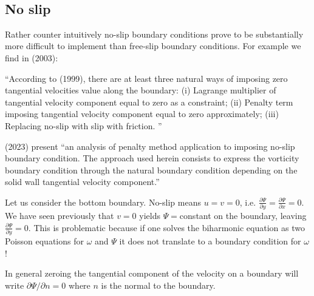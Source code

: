 \begin{center}
\\
\textcite{laym97}
\end{center}

\subsection{No slip}

Rather counter intuitively no-slip boundary conditions prove to be substantially 
more difficult to implement than free-slip boundary conditions.
For example we find in \textcite{dedz03} (2003):
\begin{displayquote}
{\color{darkgray}
``According to \textcite{layt99} (1999), there are at least three natural ways of imposing zero tangential
velocities value along the boundary:
(i) Lagrange multiplier of tangential velocity component equal to zero as a constraint;
(ii) Penalty term imposing tangential velocity component equal to zero approximately;
(iii) Replacing no-slip with slip with friction.
''}
\end{displayquote}
\textcite{dedz03} (2023) present ``an analysis of penalty method application to imposing no-slip boundary
condition. The approach used herein consists to express the vorticity boundary condition through
the natural boundary condition depending on the solid wall tangential velocity component.''

Let us consider the bottom boundary. No-slip means $u=v=0$, i.e.
$\frac{\partial \Psi}{\partial y}=\frac{\partial \Psi}{\partial x}=0$. 
We have seen previously that $v=0$ yields $\Psi=$constant on the boundary,
leaving $\frac{\partial \Psi}{\partial y}=0$. This is problematic because if 
one solves the biharmonic equation as two Poisson equations for $\omega$ and $\Psi$
it does not translate to a boundary condition for $\omega$!

In general zeroing the tangential component of the velocity on a boundary will 
write $\partial \Psi/ \partial n =0$ where $n$ is the normal to the boundary.

